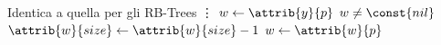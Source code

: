 \begin{codebox}
\zi \Comment Identica a quella per gli RB-Trees
\zi \vdots
\li $w \gets \attrib{y}{p}$
\li \While $w \neq \const{nil}$
\li \Do
        $\attrib{w}{size} \gets \attrib{w}{size} - 1$
\li		$w \gets \attrib{w}{p}$
    \End
\end{codebox}